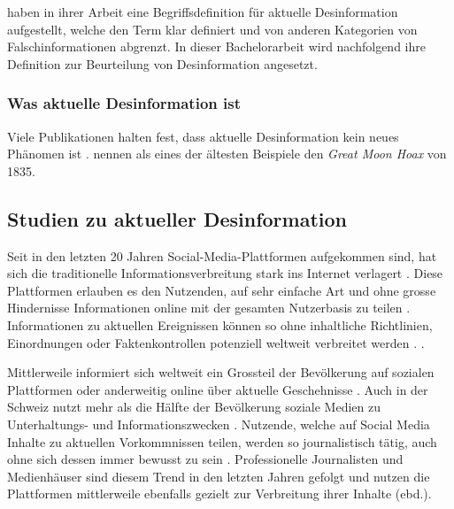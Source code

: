 \documentclass[12pt,a4paper]{article}        %
\begin{document}
\citeauthor{marx_fake_2020} haben in ihrer Arbeit eine Begriffsdefinition für aktuelle Desinformation aufgestellt, welche den Term klar definiert und von anderen Kategorien von Falschinformationen abgrenzt. In dieser Bachelorarbeit wird nachfolgend ihre Definition zur Beurteilung von Desinformation angesetzt.
\subsubsection{Was aktuelle Desinformation ist}
Viele Publikationen halten fest, dass aktuelle Desinformation kein neues Phänomen ist \parencites[vgl.\ bspw.][2]{tandoc_jr_facts_2019}[214]{allcott_social_2017}[1094]{lazer_science_2018}. \textcite[214]{allcott_social_2017} nennen als eines der ältesten Beispiele den \textit{Great Moon Hoax} von 1835.

\subsection{Studien zu aktueller Desinformation}
Seit in den letzten 20 Jahren Social-Media-Plattformen aufgekommen sind, hat sich die traditionelle Informationsverbreitung stark ins Internet verlagert \parencites[211]{allcott_social_2017}[147]{marx_fake_2020}[138]{tandoc_jr_defining_2018}[1094]{lazer_science_2018}. Diese Plattformen erlauben es den Nutzenden, auf sehr einfache Art und ohne grosse Hindernisse Informationen online mit der gesamten Nutzerbasis zu teilen \parencites[1]{vogler_wahrnehmung_2021}{lazer_science_2018}. Informationen zu aktuellen Ereignissen können so ohne inhaltliche Richtlinien, Einordnungen oder Faktenkontrollen potenziell weltweit verbreitet werden \parencites[147]{marx_fake_2020}[211]{allcott_social_2017}[4]{ceron_fake_2021}[165f]{wahl_fake_2021}.  \parencite[211]{allcott_social_2017}.

Mittlerweile informiert sich weltweit ein Grossteil der Bevölkerung auf sozialen Plattformen oder anderweitig online über aktuelle Geschehnisse \parencite[212]{allcott_social_2017}. Auch in der Schweiz nutzt mehr als die Hälfte der Bevölkerung soziale Medien zu Unterhaltungs- und Informationszwecken \parencite[21ff]{we_are_social_anteil_2024}. Nutzende, welche auf Social Media Inhalte zu aktuellen Vorkommnissen teilen, werden so journalistisch tätig, auch ohne sich dessen immer bewusst zu sein \parencite[139]{tandoc_jr_defining_2018}. Professionelle Journalisten und Medienhäuser sind diesem Trend in den letzten Jahren gefolgt und nutzen die Plattformen mittlerweile ebenfalls gezielt zur Verbreitung ihrer Inhalte (ebd.).
\end{document}
